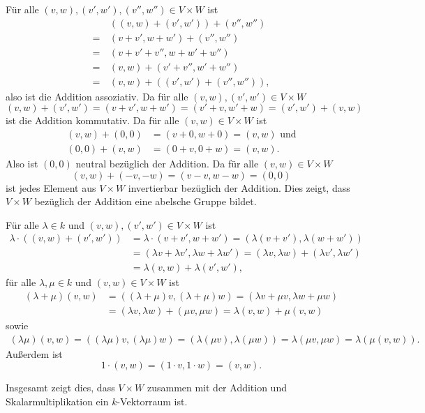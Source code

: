 \begin{solution}
 Für alle $(v,w), (v',w'), (v'',w'') \in V \times W$ ist
 \begin{align*}
   &\, ((v, w) + (v', w')) + (v'', w'') \\
  =&\, (v + v', w + w') + (v'', w'') \\
  =&\, (v + v' + v'', w + w' + w'') \\
  =&\, (v, w) + (v' + v'', w' + w'') \\
  =&\, (v, w) + ((v', w') + (v'', w'')),
 \end{align*}
 also ist die Addition assoziativ. Da für alle $(v,w), (v',w') \in V \times W$
 \[
  (v, w) + (v', w') = (v + v', w + w') = (v' + v, w' + w) = (v', w') + (v, w)
 \]
 ist die Addition kommutativ. Da für alle $(v, w) \in V \times W$ ist
 \begin{align*}
  (v, w) + (0, 0) &= (v + 0, w + 0) = (v, w) \text{ und}\\
  (0, 0) + (v, w) &= (0 + v, 0 + w) = (v, w).
 \end{align*}
 Also ist $(0, 0)$ neutral bezüglich der Addition. Da für alle $(v, w) \in V \times W$
 \[
  (v, w) + (-v, -w) = (v-v, w-w) = (0, 0)
 \]
 ist jedes Element aus $V \times W$ invertierbar bezüglich der Addition. Dies zeigt, dass $V \times W$ bezüglich der Addition eine abelsche Gruppe bildet.
 
 Für alle $\lambda \in k$ und $(v, w), (v', w') \in V \times W$ ist
 \begin{align*}
  \lambda \cdot ((v, w) + (v', w'))
  &= \lambda \cdot (v + v', w + w')
  = (\lambda (v + v'), \lambda (w + w')) \\
  &= (\lambda v + \lambda v', \lambda w + \lambda w')
  = (\lambda v, \lambda w) + (\lambda v', \lambda w') \\
  &= \lambda (v, w) + \lambda (v', w'),
 \end{align*}
 für alle $\lambda, \mu \in k$ und $(v, w) \in V \times W$ ist
 \begin{align*}
  (\lambda + \mu) (v, w)
  &= ((\lambda + \mu) v, (\lambda + \mu) w)
  = (\lambda v + \mu v, \lambda w + \mu w) \\
  &= (\lambda v, \lambda w) + (\mu v, \mu w)
  = \lambda (v, w) + \mu (v, w)
 \end{align*}
 sowie
 \begin{align*}
  (\lambda \mu) (v, w)
  = ((\lambda \mu) v, (\lambda \mu) w)
  = (\lambda (\mu v), \lambda (\mu w))
  = \lambda (\mu v, \mu w)
  = \lambda (\mu (v, w)).
 \end{align*}
 Außerdem ist
 \[
  1 \cdot (v, w)
  = (1 \cdot v, 1 \cdot w)
  = (v, w).
 \]
 
 Insgesamt zeigt dies, dass $V \times W$ zusammen mit der Addition und Skalarmultiplikation ein $k$-Vektorraum ist.
\end{solution}


